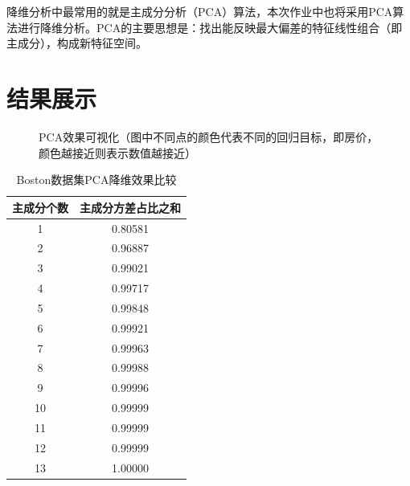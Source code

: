 \documentclass[12pt,a4paper]{article}
\theoremstyle{definition}
\begin{document}
降维分析中最常用的就是主成分分析（PCA）算法，本次作业中也将采用PCA算法进行降维分析。PCA的主要思想是：找出能反映最大偏差的特征线性组合（即主成分），构成新特征空间。

\section{结果展示}

\begin{figure}[H]
	\centering
	\caption{PCA效果可视化（图中不同点的颜色代表不同的回归目标，即房价，颜色越接近则表示数值越接近）}
	\label{fig::single_salary}
\end{figure}


\begin{table}[H]
	\renewcommand\arraystretch{1.35}
	\caption{Boston数据集PCA降维效果比较}
	\label{tab:pca_res_com}
	\centering
	
	\begin{tabular}{c|c}
		\centering
		主成分个数 &   主成分方差占比之和 \\
		\hline
		1 & 0.80581 \\
		2 & 0.96887 \\
		3 & 0.99021 \\
		4 & 0.99717 \\
		5 & 0.99848 \\
		6 & 0.99921 \\
		7 & 0.99963 \\
		8 & 0.99988 \\
		9 & 0.99996 \\
		10 & 0.99999 \\
		11 & 0.99999 \\
		12 & 0.99999 \\
		13 & 1.00000 \\
	\end{tabular}
\end{table}
\end{document}
